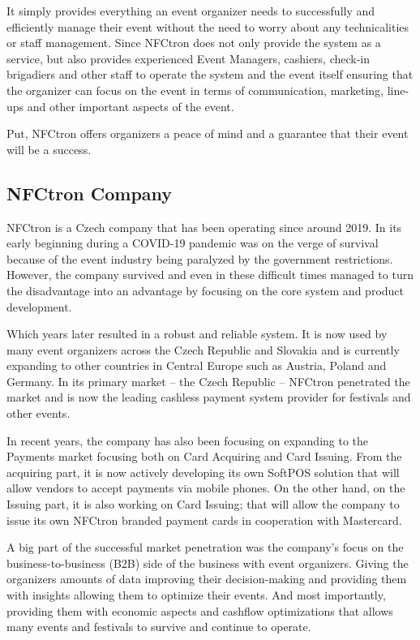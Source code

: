 It simply provides everything an event organizer needs to successfully and efficiently manage their event without the need to worry about any technicalities or staff management.
Since NFCtron does not only provide the system as a service, but also provides experienced Event Managers, cashiers, check-in brigadiers and other staff to operate the system and the event itself ensuring that the organizer can focus on the event in terms of communication, marketing, line-ups and other important aspects of the event.

Put, NFCtron offers organizers a peace of mind and a guarantee that their event will be a success.

\subsection*{NFCtron Company}
\label{subsec:introduction-background-motivation-nfctron}
NFCtron is a Czech company that has been operating since around 2019.
In its early beginning during a COVID-19 pandemic was on the verge of survival because of the event industry being paralyzed by the government restrictions.
However, the company survived and even in these difficult times managed to turn the disadvantage into an advantage by focusing on the core system and product development.

Which years later resulted in a robust and reliable system.
It is now used by many event organizers across the Czech Republic and Slovakia and is currently expanding to other countries in Central Europe such as Austria, Poland and Germany.
In its primary market – the Czech Republic – NFCtron penetrated the market and is now the leading cashless payment system provider for festivals and other events.

In recent years, the company has also been focusing on expanding to the Payments market focusing both on Card Acquiring and Card Issuing.
From the acquiring part, it is now actively developing its own SoftPOS solution that will allow vendors to accept payments via mobile phones.
On the other hand, on the Issuing part, it is also working on Card Issuing; that will allow the company to issue its own NFCtron branded payment cards in cooperation with Mastercard.

A big part of the successful market penetration was the company's focus on the business-to-business (B2B) side of the business with event organizers.
Giving the organizers amounts of data improving their decision-making and providing them with insights allowing them to optimize their events.
And most importantly, providing them with economic aspects and cashflow optimizations that allows many events and festivals to survive and continue to operate.

